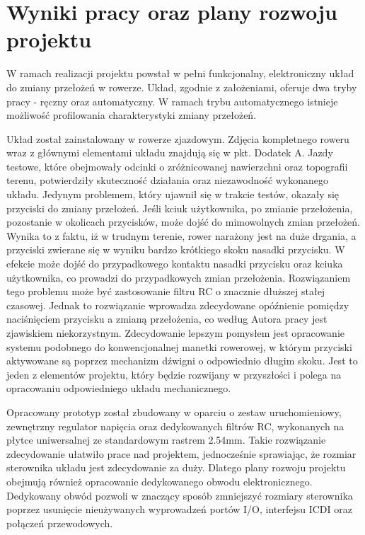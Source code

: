 \chapter{Wyniki pracy oraz plany rozwoju projektu}
W ramach realizacji projektu powstał w pełni funkcjonalny, elektroniczny układ do zmiany przełożeń w rowerze. Układ, zgodnie z założeniami, oferuje dwa tryby pracy - ręczny oraz automatyczny. W ramach trybu automatycznego istnieje możliwość profilowania charakterystyki zmiany przełożeń.

Układ został zainstalowany w rowerze zjazdowym. Zdjęcia kompletnego roweru wraz z głównymi elementami układu znajdują się w pkt. Dodatek A. Jazdy testowe, które obejmowały odcinki o zróżnicowanej nawierzchni oraz topografii terenu, potwierdziły skuteczność działania oraz niezawodność wykonanego układu. Jedynym problemem, który ujawnił się w trakcie testów, okazały się przyciski do zmiany przełożeń. Jeśli kciuk użytkownika, po zmianie przełożenia, pozostanie w okolicach przycisków, może dojść do mimowolnych zmian przełożeń. Wynika to z faktu, iż w trudnym terenie, rower narażony jest na duże drgania, a przyciski zwierane się w wyniku bardzo krótkiego skoku nasadki przycisku. W efekcie może dojść do przypadkowego kontaktu nasadki przycisku oraz kciuka użytkownika, co prowadzi do przypadkowych zmian przełożenia. Rozwiązaniem tego problemu może być zastosowanie filtru RC o znacznie dłuższej stałej czasowej. Jednak to rozwiązanie wprowadza zdecydowane opóźnienie pomiędzy naciśnięciem przycisku a zmianą przełożenia, co według Autora pracy jest zjawiskiem niekorzystnym. Zdecydowanie lepszym pomysłem jest opracowanie systemu podobnego do konwencjonalnej manetki rowerowej, w którym przyciski aktywowane są poprzez mechanizm dźwigni o odpowiednio długim skoku. Jest to jeden z elementów projektu, który będzie rozwijany w przyszłości i polega na opracowaniu odpowiedniego układu mechanicznego.

Opracowany prototyp został zbudowany w oparciu o zestaw uruchomieniowy, zewnętrzny regulator napięcia oraz dedykowanych filtrów RC, wykonanych na płytce uniwersalnej ze standardowym rastrem 2.54mm. Takie rozwiązanie zdecydowanie ułatwiło prace nad projektem, jednocześnie sprawiając, że rozmiar sterownika układu jest zdecydowanie za duży. Dlatego plany rozwoju projektu obejmują również opracowanie dedykowanego obwodu elektronicznego. Dedykowany obwód pozwoli w znaczący sposób zmniejszyć rozmiary sterownika poprzez usunięcie nieużywanych wyprowadzeń portów I/O, interfejsu ICDI oraz połączeń przewodowych.

